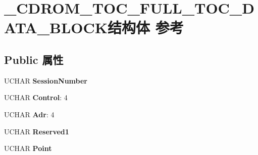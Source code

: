\hypertarget{struct___c_d_r_o_m___t_o_c___f_u_l_l___t_o_c___d_a_t_a___b_l_o_c_k}{}\section{\+\_\+\+C\+D\+R\+O\+M\+\_\+\+T\+O\+C\+\_\+\+F\+U\+L\+L\+\_\+\+T\+O\+C\+\_\+\+D\+A\+T\+A\+\_\+\+B\+L\+O\+C\+K结构体 参考}
\label{struct___c_d_r_o_m___t_o_c___f_u_l_l___t_o_c___d_a_t_a___b_l_o_c_k}
\subsection*{Public 属性}
\begin{DoxyCompactItemize}
\item 
\mbox{\label{struct___c_d_r_o_m___t_o_c___f_u_l_l___t_o_c___d_a_t_a___b_l_o_c_k_a188d8cbb07259e9411ae891049fb103f}} 
U\+C\+H\+AR {\bfseries Session\+Number}
\item 
\mbox{\label{struct___c_d_r_o_m___t_o_c___f_u_l_l___t_o_c___d_a_t_a___b_l_o_c_k_ad31c473eeae1bd142e745b96617667f4}} 
U\+C\+H\+AR {\bfseries Control}\+: 4
\item 
\mbox{\label{struct___c_d_r_o_m___t_o_c___f_u_l_l___t_o_c___d_a_t_a___b_l_o_c_k_ad6baae96c0c8326115ab578310484515}} 
U\+C\+H\+AR {\bfseries Adr}\+: 4
\item 
\mbox{\label{struct___c_d_r_o_m___t_o_c___f_u_l_l___t_o_c___d_a_t_a___b_l_o_c_k_a65a120f6c2d522c200e29afdd8dcbb1d}} 
U\+C\+H\+AR {\bfseries Reserved1}
\item 
\mbox{\label{struct___c_d_r_o_m___t_o_c___f_u_l_l___t_o_c___d_a_t_a___b_l_o_c_k_a32a92e9c5d456186974511e60d05b14e}} 
U\+C\+H\+AR {\bfseries Point}
\item 
\mbox{\label{struct___c_d_r_o_m___t_o_c___f_u_l_l___t_o_c___d_a_t_a___b_l_o_c_k_adca44126b6c95ea65ed3c7f2a58ddb61}} 

\end{DoxyCompactItemize}
